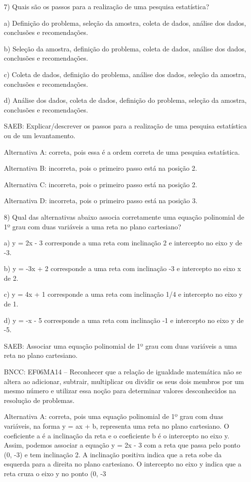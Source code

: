 7) Quais são os passos para a realização de uma pesquisa estatística?

a) Definição do problema, seleção da amostra, coleta de dados, análise
dos dados, conclusões e recomendações.

b) Seleção da amostra, definição do problema, coleta de dados, análise
dos dados, conclusões e recomendações.

c) Coleta de dados, definição do problema, análise dos dados, seleção da
amostra, conclusões e recomendações.

d) Análise dos dados, coleta de dados, definição do problema, seleção da
amostra, conclusões e recomendações.

SAEB: Explicar/descrever os passos para a realização de uma pesquisa
estatística ou de um levantamento.

Alternativa A: correta, pois essa é a ordem correta de uma pesquisa
estatística.

Alternativa B: incorreta, pois o primeiro passo está na posição 2.

Alternativa C: incorreta, pois o primeiro passo está na posição 2.

Alternativa D: incorreta, pois o primeiro passo está na posição 3.

8) Qual das alternativas abaixo associa corretamente uma equação
polinomial de 1º grau com duas variáveis a uma reta no plano cartesiano?

a) y = 2x - 3 corresponde a uma reta com inclinação 2 e intercepto no
eixo y de -3.

b) y = -3x + 2 corresponde a uma reta com inclinação -3 e intercepto no
eixo x de 2.

c) y = 4x + 1 corresponde a uma reta com inclinação 1/4 e intercepto no
eixo y de 1.

d) y = -x - 5 corresponde a uma reta com inclinação -1 e intercepto no
eixo y de -5.

SAEB: Associar uma equação polinomial de 1º grau com duas variáveis a
uma reta no plano cartesiano.

BNCC: EF06MA14 -- Reconhecer que a relação de igualdade matemática não
se altera ao adicionar, subtrair, multiplicar ou dividir os seus dois
membros por um mesmo número e utilizar essa noção para determinar
valores desconhecidos na resolução de problemas.

Alternativa A: correta, pois uma equação polinomial de 1º grau com duas
variáveis, na forma y = ax + b, representa uma reta no plano cartesiano.
O coeficiente a é a inclinação da reta e o coeficiente b é o intercepto
no eixo y. Assim, podemos associar a equação y = 2x - 3 com a reta que
passa pelo ponto (0, -3) e tem inclinação 2. A inclinação positiva
indica que a reta sobe da esquerda para a direita no plano cartesiano. O
intercepto no eixo y indica que a reta cruza o eixo y no ponto (0, -3

